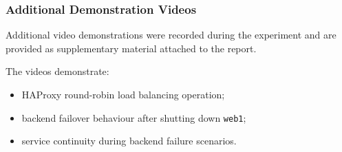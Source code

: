 \documentclass[12pt]{article}
\begin{document}
\subsubsection{Additional Demonstration Videos}

Additional video demonstrations were recorded during the experiment and are provided as supplementary material attached to the report.

The videos demonstrate:
\begin{itemize}
    \item HAProxy round-robin load balancing operation;
    \item backend failover behaviour after shutting down \texttt{web1};
    \item service continuity during backend failure scenarios.
\end{itemize}
\end{document}
